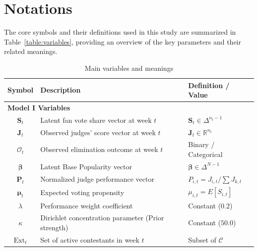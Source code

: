 \section{Notations}
\setlength{\parindent}{2em}

The core symbols and their definitions used in this study are summarized in Table~\ref{table:variables}, providing an overview of the key parameters and their related meanings.

\begin{table}[ht]
    \centering
    \caption{Main variables and meanings}
    \renewcommand{\arraystretch}{1.2}
    \begin{tabular}{cll}
        \toprule
        \textbf{Symbol}      & \textbf{Description}                               & \textbf{Definition / Value}                                  \\
        \midrule
        \multicolumn{3}{l}{\textbf{Model I Variables}}                                                                                           \\
        $\mathbf{S}_t$       & Latent fan vote share vector at week $t$           & $\mathbf{S}_t \in \Delta^{n_t-1}$                            \\
        $\mathbf{J}_t$       & Observed judges' score vector at week $t$          & $\mathbf{J}_t \in \mathbb{R}^{n_t}$                          \\
        $\mathcal{O}_t$      & Observed elimination outcome at week $t$           & Binary / Categorical                                         \\
        $\boldsymbol{\beta}$ & Latent Base Popularity vector                      & $\boldsymbol{\beta} \in \Delta^{N-1}$                        \\
        $\mathbf{P}_t$       & Normalized judge performance vector                & $P_{i,t} = J_{i,t} / \sum J_{k,t}$                           \\
        $\boldsymbol{\mu}_t$ & Expected voting propensity                         & $\mu_{i,t} = E[S_{i,t}]$                                     \\
        $\lambda$            & Performance weight coefficient                     & Constant ($0.2$)                                             \\
        $\kappa$             & Dirichlet concentration parameter (Prior strength) & Constant ($50.0$)                                            \\
        $\text{Ext}_t$       & Set of active contestants in week $t$              & Subset of $\mathcal{C}$                                      \\

\end{tabular}
\end{table}
